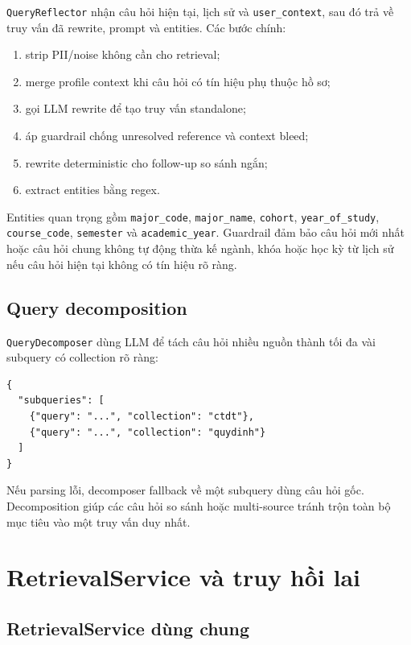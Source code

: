 \documentclass[../DoAn.tex]{subfiles}
\begin{document}
\texttt{QueryReflector} nhận câu hỏi hiện tại, lịch sử và
\texttt{user\_context}, sau đó trả về truy vấn đã rewrite, prompt và entities.
Các bước chính:

\begin{enumerate}
    \item strip PII/noise không cần cho retrieval;
    \item merge profile context khi câu hỏi có tín hiệu phụ thuộc hồ sơ;
    \item gọi LLM rewrite để tạo truy vấn standalone;
    \item áp guardrail chống unresolved reference và context bleed;
    \item rewrite deterministic cho follow-up so sánh ngắn;
    \item extract entities bằng regex.
\end{enumerate}

Entities quan trọng gồm \texttt{major\_code}, \texttt{major\_name},
\texttt{cohort}, \texttt{year\_of\_study}, \texttt{course\_code},
\texttt{semester} và \texttt{academic\_year}. Guardrail đảm bảo câu hỏi mới nhất
hoặc câu hỏi chung không tự động thừa kế ngành, khóa hoặc học kỳ từ lịch sử nếu
câu hỏi hiện tại không có tín hiệu rõ ràng.

\subsection{Query decomposition}

\texttt{QueryDecomposer} dùng LLM để tách câu hỏi nhiều nguồn thành tối đa vài
subquery có collection rõ ràng:

\begin{verbatim}
{
  "subqueries": [
    {"query": "...", "collection": "ctdt"},
    {"query": "...", "collection": "quydinh"}
  ]
}
\end{verbatim}

Nếu parsing lỗi, decomposer fallback về một subquery dùng câu hỏi gốc. Decomposition
giúp các câu hỏi so sánh hoặc multi-source tránh trộn toàn bộ mục tiêu vào một
truy vấn duy nhất.

\section{RetrievalService và truy hồi lai}

\subsection{RetrievalService dùng chung}
\end{document}
